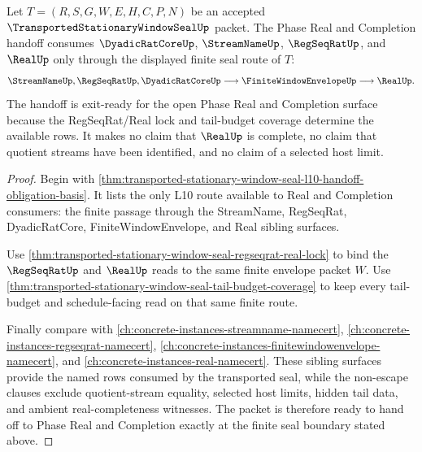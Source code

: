 \begin{theorem}
\label{thm:transported-stationary-window-seal-l10-exit-readiness}
Let $T=(R,S,G,W,E,H,C,P,N)$ be an accepted $\TransportedStationaryWindowSealUp$ packet. The Phase Real and Completion handoff consumes $\DyadicRatCoreUp$, $\StreamNameUp$, $\RegSeqRatUp$, and $\RealUp$ only through the displayed finite seal route of $T$:
$$
\begin{aligned}
  \StreamNameUp,\RegSeqRatUp,\DyadicRatCoreUp
  \longrightarrow
  \FiniteWindowEnvelopeUp
  \longrightarrow
  \RealUp .
\end{aligned}
$$
The handoff is exit-ready for the open Phase Real and Completion surface because the RegSeqRat/Real lock and tail-budget coverage determine the available rows. It makes no claim that $\RealUp$ is complete, no claim that quotient streams have been identified, and no claim of a selected host limit.
\end{theorem}
\begin{proof}
Begin with \autoref{thm:transported-stationary-window-seal-l10-handoff-obligation-basis}. It lists the only L10 route available to Real and Completion consumers: the finite passage through the StreamName, RegSeqRat, DyadicRatCore, FiniteWindowEnvelope, and Real sibling surfaces.

Use \autoref{thm:transported-stationary-window-seal-regseqrat-real-lock} to bind the $\RegSeqRatUp$ and $\RealUp$ reads to the same finite envelope packet $W$. Use \autoref{thm:transported-stationary-window-seal-tail-budget-coverage} to keep every tail-budget and schedule-facing read on that same finite route.

Finally compare with \autoref{ch:concrete-instances-streamname-namecert}, \autoref{ch:concrete-instances-regseqrat-namecert}, \autoref{ch:concrete-instances-finitewindowenvelope-namecert}, and \autoref{ch:concrete-instances-real-namecert}. These sibling surfaces provide the named rows consumed by the transported seal, while the non-escape clauses exclude quotient-stream equality, selected host limits, hidden tail data, and ambient real-completeness witnesses. The packet is therefore ready to hand off to Phase Real and Completion exactly at the finite seal boundary stated above.
\end{proof}

